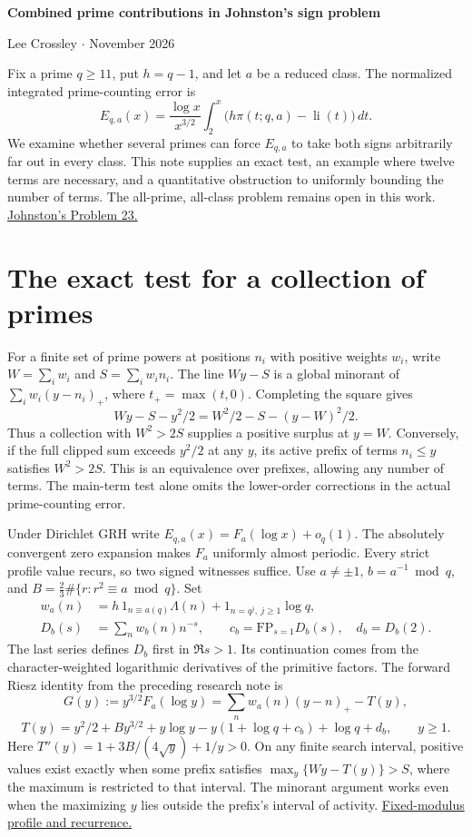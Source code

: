 \documentclass[11pt,a4paper]{article}
\newcommand{\head}[1]{\section*{\color{ink}#1}}
\newcommand{\li}{\operatorname{li}}
\begin{document}
\begin{center}
{\Large\bfseries Combined prime contributions in Johnston's sign problem\par}
\vspace{6pt}
{Lee Crossley \quad$\cdot$ November 2026}
\end{center}
Fix a prime \(q\ge11\), put \(h=q-1\), and let \(a\) be a reduced class.
The normalized integrated prime-counting error is
\[
 E_{q,a}(x)=\frac{\log x}{x^{3/2}}
 \int_2^x\!\bigl(h\pi(t;q,a)-\li(t)\bigr)\,dt .
\]
We examine whether several primes can force \(E_{q,a}\) to take both signs
arbitrarily far out in every class. This note supplies an exact test, an
example where twelve terms are necessary, and a quantitative obstruction to
uniformly bounding the number of terms. The all-prime, all-class problem
remains open in this work. \href{https://arxiv.org/pdf/2407.03530#page=9}{Johnston's Problem 23.}

\head{The exact test for a collection of primes}
For a finite set of prime powers at positions \(n_i\) with positive weights \(w_i\),
write \(W=\sum_iw_i\) and \(S=\sum_iw_i n_i\). The line \(Wy-S\) is a global
minorant of \(\sum_iw_i(y-n_i)_+\), where \(t_+=\max(t,0)\). Completing the square gives
\[
 Wy-S-y^2/2=W^2/2-S-(y-W)^2/2 .
\]
Thus a collection with \(W^2>2S\) supplies a positive surplus at \(y=W\).
Conversely, if the full clipped sum exceeds \(y^2/2\) at any \(y\), its
active prefix of terms \(n_i\le y\) satisfies \(W^2>2S\). This is an
equivalence over prefixes, allowing any number of terms. The main-term test
alone omits the lower-order corrections in the actual prime-counting error.

Under Dirichlet GRH write \(E_{q,a}(x)=F_a(\log x)+o_q(1)\). The absolutely
convergent zero expansion makes \(F_a\) uniformly almost periodic. Every
strict profile value recurs, so two signed witnesses suffice. Use \(a\ne\pm1\),
\(b=a^{-1}\bmod q\), and \(B=\frac23\#\{r:r^2\equiv a\bmod q\}\). Set
\[
 \begin{aligned}
 w_a(n)&=h\,1_{n\equiv a(q)}\Lambda(n)+1_{n=q^j,\ j\ge1}\log q,\\
 D_b(s)&=\sum_nw_b(n)n^{-s},\qquad c_b=\mathrm{FP}_{s=1}D_b(s),\quad d_b=D_b(2).
 \end{aligned}
\]
The last series defines \(D_b\) first in \(\Re s>1\). Its continuation comes
from the character-weighted logarithmic derivatives of the primitive factors.
The forward Riesz identity from the preceding research note is
\[
 G(y):=y^{3/2}F_a(\log y)=\sum_n w_a(n)(y-n)_+-T(y),
\]
\[
 T(y)=y^2/2+B y^{3/2}+y\log y-y(1+\log q+c_b)+\log q+d_b,\qquad y\ge1 .
\]
Here \(T''(y)=1+3B/(4\sqrt y)+1/y>0\). On any finite search interval,
positive values exist exactly when some prefix satisfies
\(\max_y\{Wy-T(y)\}>S\), where the maximum is restricted to that interval.
The minorant argument works even when the maximizing \(y\) lies outside the
prefix's interval of activity. \href{https://github.com/leecrossley/integrated-prime-errors-mod-11/blob/v2.0.0/range/PROOF.md}{Fixed-modulus profile and recurrence.}
\end{document}
